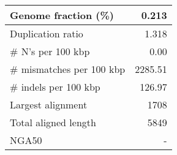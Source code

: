 \documentclass[12pt,a4paper]{article}
\begin{document}
\begin{table}[ht]
\begin{center}
\begin{tabular}{|l*{1}{|r}|}
Genome fraction (\%) & 0.213 \\ \hline
Duplication ratio & 1.318 \\ \hline
\# N's per 100 kbp & 0.00 \\ \hline
\# mismatches per 100 kbp & 2285.51 \\ \hline
\# indels per 100 kbp & 126.97 \\ \hline
Largest alignment & 1708 \\ \hline
Total aligned length & 5849 \\ \hline
NGA50 & - \\ \hline
\end{tabular}
\end{center}
\end{table}
\end{document}
